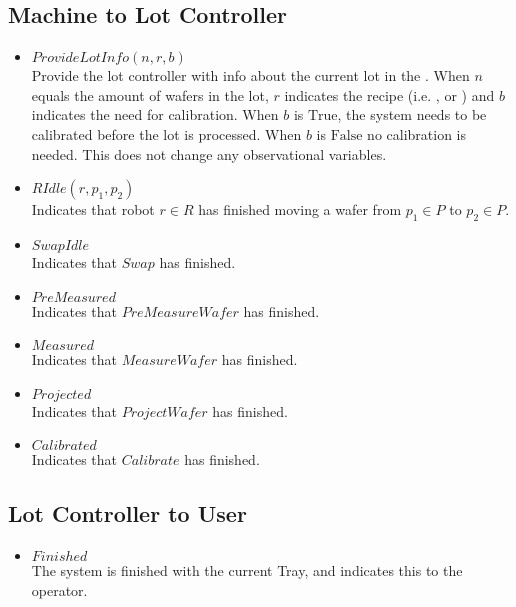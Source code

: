 \subsection{Machine to Lot Controller}
\begin{itemize}
    \item $\mathit{ProvideLotInfo}(n, r, b)$ \\
    Provide the lot controller with info about the current lot in the \tray.
    When $n$ equals the amount of wafers in the lot, $r$ indicates the recipe (i.e. \recipeOne, \recipeTwo or \recipeThree) and $b$ indicates the need for calibration.
    When $b$ is $\text{True}$, the system needs to be calibrated before the lot is processed.
    When $b$ is $\text{False}$ no calibration is needed.
    This does not change any observational variables.

    \item $\mathit{RIdle(r, p_1, p_2)}$ \\
    Indicates that robot $r \in R$ has finished moving a wafer from $p_1 \in P$ to $p_2 \in P$.
    
    \item $\mathit{SwapIdle}$ \\
    Indicates that $\mathit{Swap}$ has finished.

    \item $\mathit{PreMeasured}$ \\
    Indicates that $\mathit{PreMeasureWafer}$ has finished.

    \item $\mathit{Measured}$ \\
    Indicates that $\mathit{MeasureWafer}$ has finished.

    \item $\mathit{Projected}$ \\
    Indicates that $\mathit{ProjectWafer}$ has finished.

    \item $\mathit{Calibrated}$ \\
    Indicates that $\mathit{Calibrate}$ has finished.

\end{itemize}

\subsection{Lot Controller to User}
\begin{itemize}
    \item $\mathit{Finished}$ \\
    The system is finished with the current Tray, and indicates this to the operator.
\end{itemize}